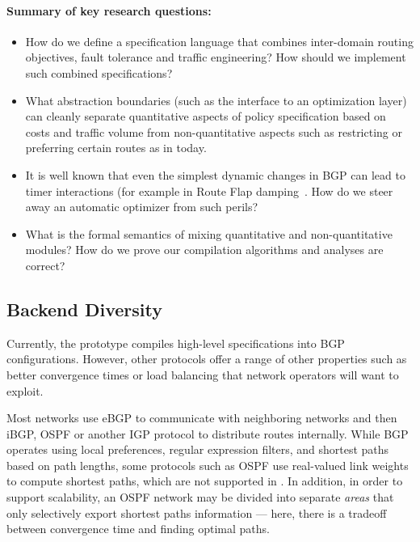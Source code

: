 \paragraph*{Summary of key research questions:}

\begin{itemize}
\item How do we define a specification language that combines inter-domain
routing objectives, fault tolerance and traffic engineering?  How
should we implement such combined specifications?
\item What abstraction boundaries (such as the interface to an optimization layer) can cleanly separate quantitative aspects of policy specification based on costs and traffic volume from non-quantitative aspects such as restricting or preferring certain routes as in \Propane today.
\item It is well known that even the simplest dynamic changes in BGP can lead to timer interactions (for example in Route Flap damping~\cite{routeflapdamping}.  How do we steer away an automatic optimizer from such perils?
\item What is the formal 
semantics of mixing quantitative and non-quantitative modules?  How do we prove our
compilation algorithms and analyses are correct?
\end{itemize}

\subsection{Backend Diversity}
\label{sec:diversity}

Currently, the \Name prototype compiles high-level specifications into BGP
configurations.  However, other protocols offer a range of other properties
such as better convergence times or load balancing that network operators 
will want to exploit.

Most networks use
eBGP to communicate with neighboring networks and 
then iBGP, OSPF or another IGP protocol to distribute routes internally.
While BGP operates using local preferences, regular expression filters,
and shortest paths based on path lengths, some protocols such as OSPF
use real-valued link weights to compute shortest paths, which are not
supported in \Propane.  In addition, in order to support scalability, 
an OSPF network may be divided into separate \emph{areas} that only selectively
export shortest paths information --- here, there is a tradeoff between 
convergence time and finding optimal paths.  

